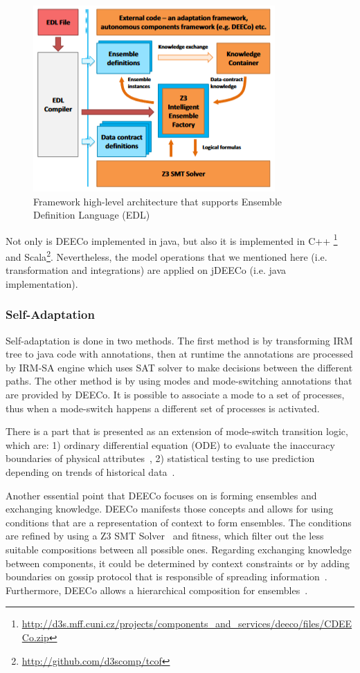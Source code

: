 \begin{figure}[!h]
\centering
\includegraphics[scale=0.85]{figures/edl}
\caption{Framework high-level architecture that supports Ensemble Definition Language (EDL)}
\label{fig:ros}
\end{figure}

Not only is DEECo implemented in java, but also it is implemented in C++ \footnote{\url{http://d3s.mff.cuni.cz/projects/components_and_services/deeco/files/CDEECo.zip}} and Scala\footnote{\url{ http://github.com/d3scomp/tcof}}. Nevertheless, the model operations that we mentioned here (i.e. transformation and integrations) are applied on jDEECo (i.e. java implementation).

 
\subsubsection{Self-Adaptation}
Self-adaptation is done in two methods. The first method is by transforming IRM tree to java code with annotations, then at runtime the annotations are processed by IRM-SA engine which uses SAT solver to make decisions between the different paths. The other method is by using modes and mode-switching annotations that are provided by DEECo. It is possible to associate a mode to a set of processes, thus when a mode-switch happens a different set of processes is activated.

There is a part that is presented as an extension of mode-switch transition logic, which are: 1) ordinary differential equation (ODE) to evaluate the inaccuracy boundaries of physical attributes~\cite{10.1109/WICSA.2014.20}, 2) statistical testing to use prediction depending on trends of historical data~\cite{7516826}.

Another essential point that DEECo focuses on is forming ensembles and exchanging knowledge. DEECo manifests those concepts and allows for using conditions that are a representation of context to form ensembles. The conditions are refined by using a Z3 SMT Solver~\cite{Krijt2017Intelligent} and fitness, which filter out the less suitable compositions between all possible ones. Regarding exchanging knowledge between components, it could be determined by context constraints or by adding boundaries on gossip protocol that is responsible of spreading information~\cite{Bures2014}. Furthermore, DEECo allows a hierarchical composition for ensembles~\cite{Bures:2015:TIE:2797433.2797450}\cite{Bures2016}.

